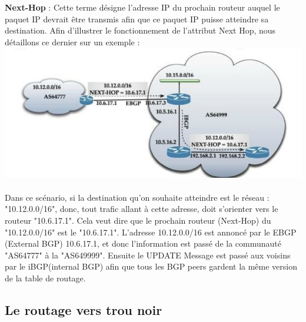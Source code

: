 \pagebreak
\textbf{Next-Hop}\cite{Routing_BGP} : Cette terme désigne l'adresse IP du prochain routeur auquel le paquet IP devrait être transmis afin que ce paquet IP puisse atteindre sa destination.
\newline
Afin d'illustrer le fonctionnement de l'attribut Next Hop, nous détaillons ce dernier sur un exemple :  
\newline
\includegraphics[scale = 0.5]{img/nextHope.jpg}
\\
\\
  Dans ce scénario, si la destination qu'on souhaite atteindre est le réseau : "10.12.0.0/16", donc, tout trafic allant à cette adresse, doit s'orienter vers le routeur "10.6.17.1". Cela veut dire que le prochain routeur (Next-Hop) du "10.12.0.0/16" est le "10.6.17.1".
\newline
L'adresse 10.12.0.0/16 est annoncé par le EBGP (External BGP) 10.6.17.1, et donc l'information est passé de la communauté "AS64777" à la "AS649999". Ensuite le UPDATE Message est passé aux voisins par le iBGP(internal BGP) afin que tous les BGP peers gardent la même version de la table de routage. 

\subsection{Le routage vers trou noir \cite{Cisco}} 

